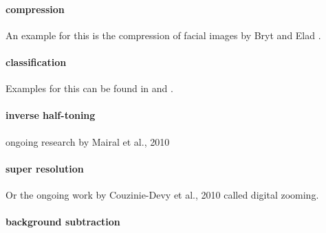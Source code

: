 \paragraph{compression} An example for this is the compression of facial images by Bryt and Elad \cite{Bryt2008}.

\paragraph{classification} Examples for this can be found in \cite{Mairal2008b} and \cite{Bar2009}.
\paragraph{inverse half-toning} ongoing research by Mairal et al., 2010 \cite{Mairal2010b}
\paragraph{super resolution} \cite{Yang2010} \cite{Wright2008}  
Or the ongoing work by Couzinie-Devy et al., 2010 called digital zooming.
\paragraph{background subtraction} \cite{}







